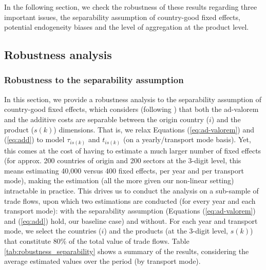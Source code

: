 \documentclass[a4paper,11pt]{article}
\begin{document}
In the following section, we check the robustness of these results regarding three important issues, the separability assumption of country-good fixed effects, potential endogeneity biases and the level of aggregation at the product level.

\subsection{Robustness analysis \label{sec:robustness}}


\subsubsection{Robustness to the separability assumption}
In this section, we provide a robustness analysis to the separability assumption of country-good fixed effects, which considers (following \citealp{Irrazabal_2015}) that both the ad-valorem and the additive costs are separable between the origin country ($i$) and the product ($s(k)$) dimensions.
That is, we relax Equations (\ref{eq:ad-valorem}) and (\ref{eq:add}) to model $\tau_{is(k)}$ and $t_{is(k)}$ (on a yearly/transport mode basis).
Yet, this comes at the cost of having to estimate a much larger number of fixed effects (for approx. 200 countries of origin and 200 sectors at the 3-digit level, this means estimating 40,000 versus 400 fixed effects, per year and per transport mode), making the estimation (all the more given our non-linear setting) intractable in practice.
This drives us to conduct the analysis on a sub-sample of trade flows, upon which two estimations are conducted (for every year and each transport mode): with the separability assumption (Equations (\ref{eq:ad-valorem}) and (\ref{eq:add}) hold, our baseline case) and without.
For each year and transport mode, we select the countries ($i$) and the products (at the 3-digit level, $s(k)$) that constitute 80\% of the total value of trade flows. Table \ref{tab:robustness_separability} shows a summary of the results, considering the average estimated values over the period (by transport mode).
%
\end{document}
